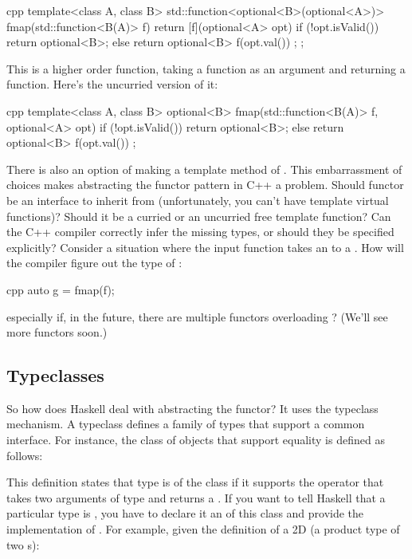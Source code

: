 \begin{snip}{cpp}
template<class A, class B>
std::function<optional<B>(optional<A>)>
fmap(std::function<B(A)> f) { 
    return [f](optional<A> opt) { 
        if (!opt.isValid()) 
            return optional<B>{};
        else 
            return optional<B>{ f(opt.val()) };
    };
}
\end{snip}
This is a higher order function, taking a function as an argument and
returning a function. Here's the uncurried version of it:

\begin{snip}{cpp}
template<class A, class B>
optional<B> fmap(std::function<B(A)> f, optional<A> opt) { 
    if (!opt.isValid())
        return optional<B>{};
    else 
        return optional<B>{ f(opt.val()) };
}
\end{snip}
There is also an option of making  a template method of
. This embarrassment of choices makes abstracting the
functor pattern in C++ a problem. Should functor be an interface to
inherit from (unfortunately, you can't have template virtual functions)?
Should it be a curried or an uncurried free template function? Can the
C++ compiler correctly infer the missing types, or should they be
specified explicitly? Consider a situation where the input function
 takes an  to a . How will the
compiler figure out the type of :

\begin{snip}{cpp}
auto g = fmap(f);
\end{snip}
especially if, in the future, there are multiple functors overloading
? (We'll see more functors soon.)

\subsection{Typeclasses}

So how does Haskell deal with abstracting the functor? It uses the
typeclass mechanism. A typeclass defines a family of types that support
a common interface. For instance, the class of objects that support
equality is defined as follows:

This definition states that type  is of the class 
if it supports the operator \code{(==)} that takes two arguments of
type  and returns a . If you want to tell Haskell
that a particular type is , you have to declare it an
 of this class and provide the implementation of
\code{(==)}. For example, given the definition of a 2D 
(a product type of two s):

